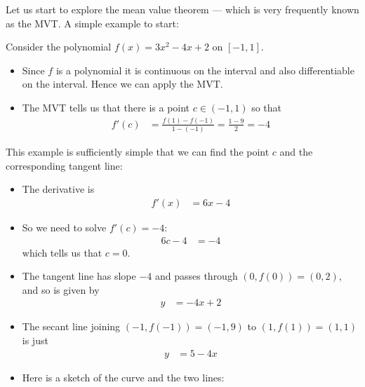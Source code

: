 Let us start to explore the mean value theorem --- which is very frequently known as the
MVT. A simple example to start:
\begin{eg}
Consider the polynomial $f(x)=3x^2-4x+2$ on $[-1,1]$.
\begin{itemize}
 \item Since $f$ is a polynomial it is continuous on the interval and also differentiable
on the interval. Hence we can apply the MVT.
\item The MVT tells us that there is a point $c \in (-1,1)$ so that
\begin{align*}
  f'(c) &= \frac{f(1)-f(-1)}{1-(-1)} = \frac{1-9}{2} =-4
\end{align*}
\end{itemize}
This example is sufficiently simple that we can find the point $c$ and the corresponding
tangent line:
\begin{itemize}
 \item The derivative is
\begin{align*}
  f'(x) &= 6x-4
\end{align*}
\item So we need to solve $f'(c)=-4$:
\begin{align*}
  6c-4 &= -4
\end{align*}
which tells us that $c=0$.
\item The tangent line has slope $-4$ and passes through $(0,f(0))=(0,2)$, and so is
given by
\begin{align*}
  y &= -4x+2
\end{align*}
\item The secant line joining $(-1,f(-1))=(-1,9)$ to $(1,f(1))=(1,1)$ is just
\begin{align*}
  y &= 5-4x
\end{align*}
\item Here is a sketch of the curve and the two lines:
\begin{efig}
\begin{center}
\end{center}
\end{efig}
\end{itemize}

\end{eg}

